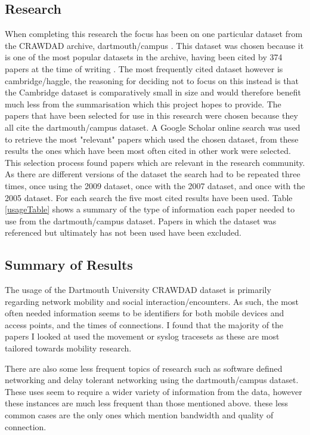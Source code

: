 \subsection{Research}

When completing this research the focus has been on one particular dataset from the CRAWDAD archive, dartmouth/campus \cite{dartmouthcampus2009}. This dataset was chosen because it is one of the most popular datasets in the archive, having been cited by 374 papers at the time of writing \cite{aboutCrawdad2014}. The most frequently cited dataset however is cambridge/haggle, the reasoning for deciding not to focus on this instead is that the Cambridge dataset is comparatively small in size and would therefore benefit much less from the summarisation which this project hopes to provide.
\newline
The papers that have been selected for use in this research were chosen because they all cite the dartmouth/campus dataset. A Google Scholar \cite{googleScholar} online search was used to retrieve the most "relevant" papers which used the chosen dataset, from these results the ones which have been most often cited in other work were selected. This selection process found papers which are relevant in the research community. As there are different versions of the dataset the search had to be repeated three times, once using the 2009 dataset, once with the 2007 dataset, and once with the 2005 dataset. For each search the five most cited results have been used. Table \ref{usageTable} shows a summary of the type of information each paper needed to use from the dartmouth/campus dataset. Papers in which the dataset was referenced but ultimately has not been used have been excluded.



\subsection{Summary of Results}
The usage of the Dartmouth University CRAWDAD dataset is primarily regarding network mobility and social interaction/encounters. As such, the most often needed information seems to be identifiers for both mobile devices and access points, and the times of connections.
I found that the majority of the papers I looked at used the movement \cite{dartmouthcampus2009movement} or syslog \cite{dartmouthcampus2009syslog} tracesets as these are most tailored towards mobility research. 

There are also some less frequent topics of research such as software defined networking and delay tolerant networking using the dartmouth/campus dataset. These uses seem to require a wider variety of information from the data, however these instances are much less frequent than those mentioned above. these less common cases are the only ones which mention bandwidth and quality of connection.


